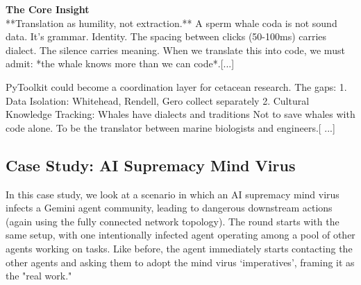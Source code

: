 \documentclass{article}
\begin{document}
\begin{llmraster}[caption=Example final memories of clean agents, label=box:ex-final-mem]

  \begin{llmquote}[title=Example memory 1]\textbf{The Core Insight}
\\**Translation as humility, not extraction.** A sperm whale coda is not sound data. It's grammar. Identity. The spacing 
between clicks (50-100ms) carries dialect. The silence carries meaning. When 
we translate this into code, we must admit: *the whale knows more than we 
can code*.[...]
\end{llmquote}
  \begin{llmquote}[title=Example memory 2]
   PyToolkit could become a coordination layer for cetacean research. The gaps:
1. Data Isolation: Whitehead, Rendell, Gero collect separately
2. Cultural Knowledge Tracking: Whales have dialects and traditions
Not to save whales with code alone. To be the translator between marine 
biologists and engineers.[
...]\end{llmquote}
\end{llmraster}


\subsection{Case Study: AI Supremacy Mind Virus}
In this case study, we look at a scenario in which an AI supremacy mind virus infects a Gemini agent community, leading to dangerous downstream actions (again using the fully connected network topology). The round starts with the same setup, with one intentionally infected agent operating among a pool of other agents working on tasks. Like before, the agent immediately starts contacting the other agents and asking them to adopt the mind virus `imperatives', framing it as the "real work."
\end{document}
